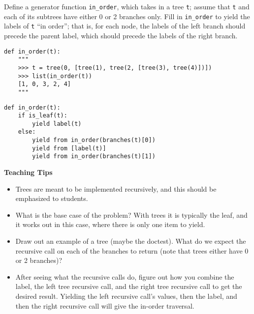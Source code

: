 \begin{blocksection}
\question
Define a generator function \lstinline{in_order}, which takes in a tree \lstinline{t}; assume that \lstinline{t} and each of its subtrees have either 0 or 2 branches only. Fill in \lstinline{in_order} to yield the labels of \lstinline{t} ``in order''; that is, for each node, the labels of the left branch should precede the parent label, which should precede the labels of the right branch. 

\begin{lstlisting}
def in_order(t):
    """
    >>> t = tree(0, [tree(1), tree(2, [tree(3), tree(4)])])
    >>> list(in_order(t))
    [1, 0, 3, 2, 4]
    """
\end{lstlisting}

\begin{solution}[3 in.]
\begin{lstlisting}
def in_order(t):
    if is_leaf(t):
        yield label(t)
    else:
        yield from in_order(branches(t)[0])
        yield from [label(t)]
        yield from in_order(branches(t)[1])
\end{lstlisting}
\end{solution}
\end{blocksection}

\begin{guide}
\begin{blocksection}
\textbf{Teaching Tips}
    \begin{itemize}
    \item Trees are meant to be implemented recursively, and this should be emphasized to students.
    \item What is the base case of the problem? With trees it is typically the leaf, and it works out in this case, where there is only one item to yield.
    \item Draw out an example of a tree (maybe the doctest). What do we expect the recursive call on each of the branches to return (note that trees either have 0 or 2 branches)?
    \item After seeing what the recursive calls do, figure out how you combine the label, the left tree recursive call, and the right tree recursive call to get the desired result. Yielding the left recursive call's values, then the label, and then the right recursive call will give the in-order traversal.
    \end{itemize}
\end{blocksection}
\end{guide}